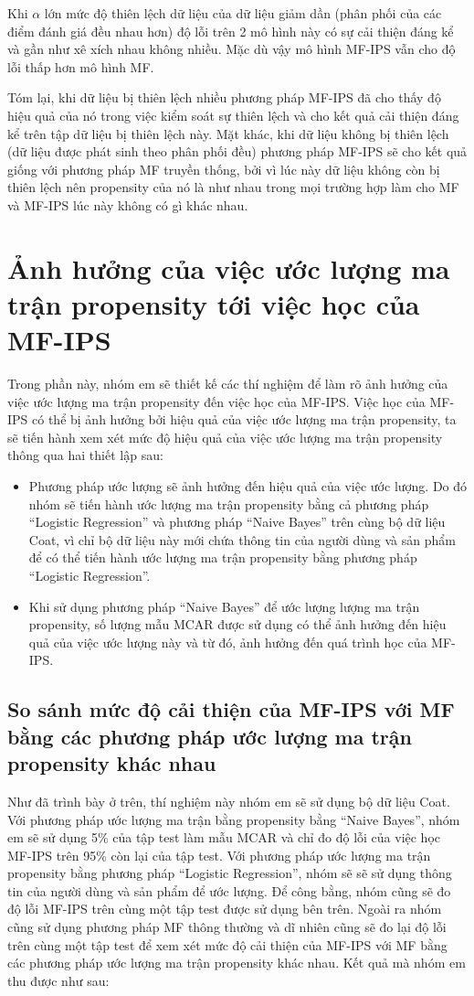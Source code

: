 Khi $\alpha$ lớn mức độ thiên lệch dữ liệu của dữ liệu giảm dần (phân phối của các điểm đánh giá đều nhau hơn)
độ lỗi trên 2 mô hình này có sự cải thiện đáng kể và gần như xê xích nhau không nhiều. Mặc dù vậy mô hình MF-IPS vẫn cho độ lỗi thấp hơn mô hình MF. 

Tóm lại, khi dữ liệu bị thiên lệch nhiều phương pháp MF-IPS đã cho thấy độ hiệu quả của nó trong việc kiểm soát sự thiên lệch và cho kết quả cải thiện đáng kể trên tập dữ liệu bị thiên lệch này. Mặt khác, khi dữ liệu không bị thiên lệch (dữ liệu được phát sinh theo phân phối đều) phương pháp MF-IPS sẽ cho kết quả giống với phương pháp MF truyền thống, bởi vì lúc này dữ liệu không còn bị thiên lệch nên propensity của nó là như nhau trong mọi trường hợp làm cho MF và MF-IPS lúc này không có gì khác nhau.

\section{Ảnh hưởng của việc ước lượng ma trận propensity tới việc học của MF-IPS}
Trong phần này, nhóm em sẽ thiết kế các thí nghiệm để làm rõ ảnh hưởng của việc ước lượng ma trận propensity đến việc học của MF-IPS. Việc học của MF-IPS có thể bị ảnh hưởng bởi hiệu quả của việc ước lượng ma trận propensity, ta sẽ tiến hành xem xét mức độ hiệu quả của việc ước lượng ma trận propensity thông qua hai thiết lập sau:
\begin{itemize}
    \item Phương pháp ước lượng sẽ ảnh hưởng đến hiệu quả của việc ước lượng. Do đó nhóm sẽ tiến hành ước lượng ma trận propensity bằng cả phương pháp ``Logistic Regression'' và phương pháp ``Naive Bayes'' trên cùng bộ dữ liệu Coat, vì chỉ bộ dữ liệu này mới chứa thông tin của người dùng và sản phẩm để có thể tiến hành ước lượng ma trận propensity bằng phương pháp ``Logistic Regression''. 
    \item Khi sử dụng phương pháp ``Naive Bayes'' để ước lượng lượng ma trận propensity, số lượng mẫu MCAR được sử dụng có thể ảnh hưởng đến hiệu quả của việc ước lượng này và từ đó, ảnh hưởng đến quá trình học của MF-IPS.
\end{itemize}

\subsection{So sánh mức độ cải thiện của MF-IPS với MF bằng các phương pháp ước lượng ma trận propensity khác nhau}
Như đã trình bày ở trên, thí nghiệm này nhóm em sẽ sử dụng bộ dữ liệu Coat.
Với phương pháp ước lượng ma trận bằng propensity bằng ``Naive Bayes'', nhóm em sẽ sử dụng 5\% của tập test làm mẫu MCAR và chỉ đo độ lỗi của việc học MF-IPS trên 95\% còn lại của tập test. Với phương pháp ước lượng ma trận propensity bằng phương pháp ``Logistic Regression'', nhóm sẽ sẽ sử dụng thông tin của người dùng và sản phẩm để ước lượng. Để công bằng, nhóm cũng sẽ đo độ lỗi MF-IPS trên cùng một tập test được sử dụng bên trên. Ngoài ra nhóm cũng sử dụng phương pháp MF thông thường và dĩ nhiên cũng sẽ đo lại độ lỗi trên cùng một tập test để xem xét mức độ cải thiện của MF-IPS với MF bằng các phương pháp ước lượng ma trận propensity khác nhau. Kết quả mà nhóm em thu được như sau:

